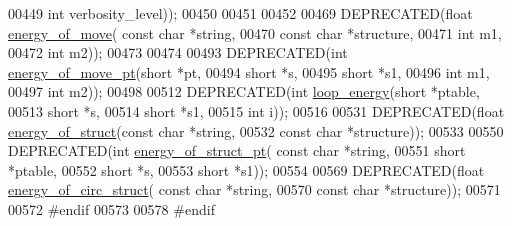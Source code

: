 \begin{DoxyCode}
00449                             \textcolor{keywordtype}{int} verbosity\_level));
00450 
00451 
00452 
00469 DEPRECATED(\textcolor{keywordtype}{float} \hyperlink{group__eval_ga539ecaed89730f7644c202f304d7529b}{energy\_of\_move}( \textcolor{keyword}{const} \textcolor{keywordtype}{char} *\textcolor{keywordtype}{string},
00470                       \textcolor{keyword}{const} \textcolor{keywordtype}{char} *structure,
00471                       \textcolor{keywordtype}{int} m1,
00472                       \textcolor{keywordtype}{int} m2));
00473 
00474 
00493 DEPRECATED(\textcolor{keywordtype}{int} \hyperlink{group__eval_ga49e0ee561be69faf0568213546f6a53f}{energy\_of\_move\_pt}(\textcolor{keywordtype}{short} *pt,
00494                    \textcolor{keywordtype}{short} *s,
00495                    \textcolor{keywordtype}{short} *s1,
00496                    \textcolor{keywordtype}{int} m1,
00497                    \textcolor{keywordtype}{int} m2));
00498 
00512 DEPRECATED(\textcolor{keywordtype}{int}   \hyperlink{group__eval_ga507d4fd93f4b398d793ba2402731388d}{loop\_energy}(\textcolor{keywordtype}{short} *ptable,
00513                   \textcolor{keywordtype}{short} *s,
00514                   \textcolor{keywordtype}{short} *s1,
00515                   \textcolor{keywordtype}{int} i));
00516 
00531 DEPRECATED(\textcolor{keywordtype}{float} \hyperlink{group__eval_gac2b37fea2145c94d925a3f33378ef87b}{energy\_of\_struct}(\textcolor{keyword}{const} \textcolor{keywordtype}{char} *\textcolor{keywordtype}{string},
00532                                   \textcolor{keyword}{const} \textcolor{keywordtype}{char} *structure));
00533 
00550 DEPRECATED(\textcolor{keywordtype}{int} \hyperlink{group__eval_ga27ce6f68512d43bf1fe14a06c9d76d5c}{energy\_of\_struct\_pt}( \textcolor{keyword}{const} \textcolor{keywordtype}{char} *\textcolor{keywordtype}{string},
00551                                     \textcolor{keywordtype}{short} *ptable,
00552                                     \textcolor{keywordtype}{short} *s,
00553                                     \textcolor{keywordtype}{short} *s1));
00554 
00569 DEPRECATED(\textcolor{keywordtype}{float} \hyperlink{group__eval_ga657222e2758c46bf13b416ef3032e417}{energy\_of\_circ\_struct}( \textcolor{keyword}{const} \textcolor{keywordtype}{char} *\textcolor{keywordtype}{string},
00570                                         \textcolor{keyword}{const} \textcolor{keywordtype}{char} *structure));
00571 
00572 \textcolor{preprocessor}{#endif}
00573 
00578 \textcolor{preprocessor}{#endif}
\end{DoxyCode}
